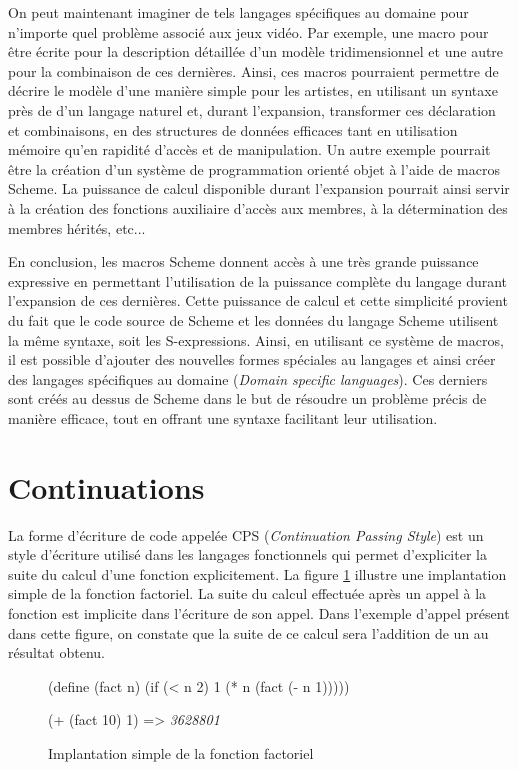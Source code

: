 \documentclass[12pt,oneside,letterpaper,francais]{book}
\newcommand{\scheme}[1]{\selectlanguage{english}{\tt #1}\selectlanguage{french}}
\newcommand{\schemeresult}[1]{{\it #1}}
\begin{document}
On peut maintenant imaginer de tels langages spécifiques au domaine
pour n'importe quel problème associé aux jeux vidéo. Par exemple, une
macro pour être écrite pour la description détaillée d'un modèle
tridimensionnel et une autre pour la combinaison de ces
dernières. Ainsi, ces macros pourraient permettre de décrire le modèle
d'une manière simple pour les artistes, en utilisant un syntaxe près
de d'un langage naturel et, durant l'expansion, transformer ces
déclaration et combinaisons, en des structures de données efficaces
tant en utilisation mémoire qu'en rapidité d'accès et de
manipulation. Un autre exemple pourrait être la création d'un système
de programmation orienté objet à l'aide de macros Scheme. La puissance
de calcul disponible durant l'expansion pourrait ainsi servir à la
création des fonctions auxiliaire d'accès aux membres, à la
détermination des membres hérités, etc...

En conclusion, les macros Scheme donnent accès à une très grande
puissance expressive en permettant l'utilisation de la puissance
complète du langage durant l'expansion de ces dernières. Cette
puissance de calcul et cette simplicité provient du fait que le code
source de Scheme et les données du langage Scheme utilisent la même
syntaxe, soit les S-expressions. Ainsi, en utilisant ce système de
macros, il est possible d'ajouter des nouvelles formes spéciales au
langages et ainsi créer des langages spécifiques au domaine
(\textit{Domain specific languages}). Ces derniers sont créés au
dessus de Scheme dans le but de résoudre un problème précis de manière
efficace, tout en offrant une syntaxe facilitant leur utilisation.



\section{Continuations}

La forme d'écriture de code appelée CPS (\textit{Continuation Passing
  Style}) est un style d'écriture utilisé dans les langages
fonctionnels qui permet d'expliciter la suite du calcul d'une fonction
explicitement. La figure \ref{Scheme:fact} illustre une implantation
simple de la fonction factoriel. La suite du calcul effectuée après un
appel à la fonction \scheme{fact} est implicite dans l'écriture de son
appel. Dans l'exemple d'appel présent dans cette figure, on constate
que la suite de ce calcul sera l'addition de un au résultat obtenu.

\begin{figure}[htb!]
  \begin{schemecode}
(define (fact n)
  (if (< n 2)
      1
      (* n (fact (- n 1)))))

(+ (fact 10) 1) => \schemeresult{3628801}
  \end{schemecode}
  \caption{Implantation simple de la fonction factoriel}
  \label{Scheme:fact}
\end{figure}
\end{document}

